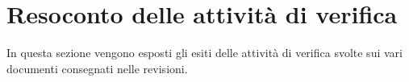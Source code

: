 \section{Resoconto delle attività di verifica}
In questa sezione vengono esposti gli esiti delle attivit\`a di verifica svolte sui vari documenti consegnati nelle revisioni.